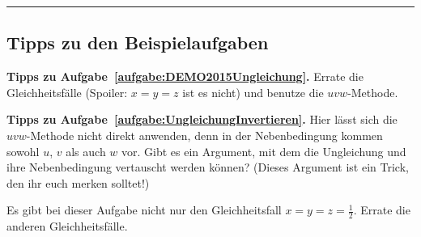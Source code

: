 \vfill\hrule\vspace{-1em}

\subsection*{Tipps zu den Beispielaufgaben}
\textbf{Tipps zu Aufgabe~\ref{aufgabe:DEMO2015Ungleichung}.} Errate die Gleichheitsfälle (Spoiler: $x=y=z$ ist es nicht) und benutze die $uvw$-Methode.	

\textbf{Tipps zu Aufgabe~\ref{aufgabe:UngleichungInvertieren}.} Hier lässt sich die $uvw$-Methode nicht direkt anwenden, denn in der Nebenbedingung kommen sowohl $u$, $v$ als auch $w$ vor. Gibt es ein Argument, mit dem die Ungleichung und ihre Nebenbedingung vertauscht werden können? (Dieses Argument ist ein Trick, den ihr euch merken solltet!)

Es gibt bei dieser Aufgabe nicht nur den Gleichheitsfall $x=y=z=\frac12$. Errate die anderen Gleichheitsfälle.